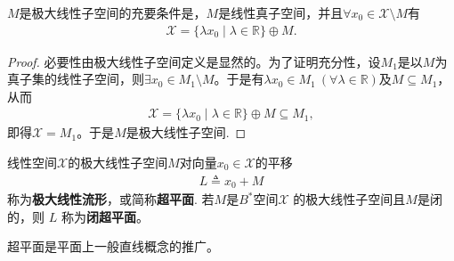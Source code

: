 \documentclass[../../main.tex]{subfiles}%
\begin{document}
\begin{proposition}\label{proposition:极大线性子空间诱导空间直和分解}
$M$是极大线性子空间的充要条件是，$M$是线性真子空间，并且$\forall x_0 \in \mathscr{X} \setminus M$有
\begin{align*}
\mathscr{X} = \{\lambda x_0 \mid \lambda \in \mathbb{R}\} \oplus M.
\end{align*}
\end{proposition}
\begin{proof}
必要性由极大线性子空间定义是显然的。为了证明充分性，设$M_1$是以$M$为真子集的线性子空间，则$\exists x_0 \in M_1 \setminus M$。于是有$\lambda x_0 \in M_1 \ (\forall \lambda \in \mathbb{R})$及$M \subseteq M_1$，从而
\begin{align*}
\mathscr{X} = \{\lambda x_0 \mid \lambda \in \mathbb{R}\} \oplus M \subseteq M_1,
\end{align*}
即得$\mathscr{X} = M_1$。于是$M$是极大线性子空间.
\end{proof}

\begin{definition}
线性空间$\mathscr{X}$的极大线性子空间$M$对向量$x_0 \in \mathscr{X}$的平移
\begin{align*}
L \triangleq x_0 + M
\end{align*}
称为\textbf{极大线性流形}，或简称\textbf{超平面}.
若$M$是$B^*$空间$\mathscr{X}$ 的极大线性子空间且$M$是闭的，则 $L$ 称为\textbf{闭超平面}。
\end{definition}
\begin{remark}
超平面是平面上一般直线概念的推广。
\end{remark}
\end{document}
